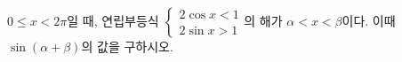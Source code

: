 $0\le x<2\pi$일 때, 연립부등식 $\begin{cases} 2\cos x<1 \\ 2\sin x>1 \end{cases}$의 해가 $\alpha<x<\beta$이다. 이때 $\sin(\alpha+\beta)$의 값을 구하시오.
